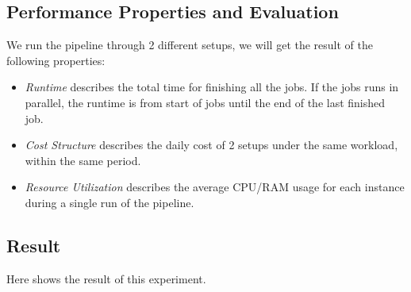 \subsection{Performance Properties and Evaluation}
We run the pipeline through 2 different setups, we will get the result of the following properties:
\begin{itemize}
    \item \textit{Runtime} describes the total time for finishing all the jobs. If the jobs runs in parallel, the runtime is from start of jobs until the end of the last finished job.
    \item \textit{Cost Structure} describes the daily cost of 2 setups under the same workload, within the same period.
    \item \textit{Resource Utilization} describes the average CPU/RAM usage for each instance during a single run of the pipeline.
\end{itemize}
\subsection{Result}
Here shows the result of this experiment.
